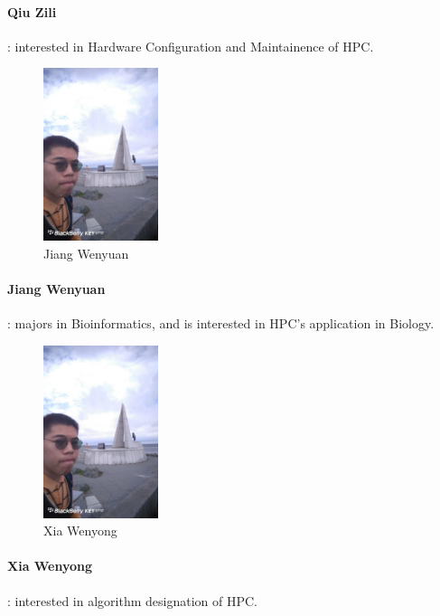\documentclass[a4paper, 11pt]{article}
\begin{document}
			\paragraph{Qiu Zili}: interested in Hardware Configuration and Maintainence of HPC.
			
			
			\begin{figure}[H]
				\centering
				\includegraphics[width=0.3\textwidth]{Lu.jpg}
				\caption{Jiang Wenyuan} %
				\label{photo:4}  %
			\end{figure} 
			\paragraph{Jiang Wenyuan}: majors in Bioinformatics, and is interested in HPC's application in Biology.
			
			
			\begin{figure}[H]
				\centering
				\includegraphics[width=0.3\textwidth]{Lu.jpg}
				\caption{Xia Wenyong} %
				\label{photo:5}  %
			\end{figure} 
			\paragraph{Xia Wenyong}: interested in algorithm designation of HPC.
			
\end{document}
